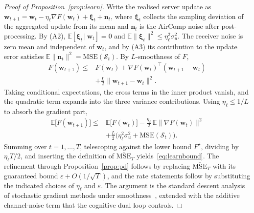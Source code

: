\documentclass[lettersize,journal]{IEEEtran}
\newcommand{\bw}{\bm{w}}
\newcommand{\calS}{\mathcal{S}}
\begin{document}
\begin{proof}[Proof of Proposition~\ref{prop:learn}]
Write the realised server update as $\bw_{t+1}=\bw_t-\eta_\ell\nabla F(\bw_t)+\bm{\xi}_t+\bm{n}_t$, where $\bm{\xi}_t$ collects the sampling deviation of the aggregated update from its mean and $\bm{n}_t$ is the AirComp noise after post-processing. By (A2), $\mathbb{E}[\bm{\xi}_t\,|\,\bw_t]=0$ and $\mathbb{E}\lVert\bm{\xi}_t\rVert^2\le\eta_\ell^2\sigma_u^2$. The receiver noise is zero mean and independent of $\bw_t$, and by (A3) its contribution to the update error satisfies $\mathbb{E}\lVert\bm{n}_t\rVert^2=\mathrm{MSE}(\calS_t)$. By $L$-smoothness of $F$,
\begin{align*}
F(\bw_{t+1})\le{}& F(\bw_t)+\nabla F(\bw_t)^{\!\top}(\bw_{t+1}-\bw_t)\\
&+\tfrac{L}{2}\lVert\bw_{t+1}-\bw_t\rVert^2 .
\end{align*}
Taking conditional expectations, the cross terms in the inner product vanish, and the quadratic term expands into the three variance contributions. Using $\eta_\ell\le 1/L$ to absorb the gradient part,
\begin{align*}
\mathbb{E}\big[F(\bw_{t+1})\big]\le{}&\mathbb{E}\big[F(\bw_t)\big]-\tfrac{\eta_\ell}{2}\,\mathbb{E}\lVert\nabla F(\bw_t)\rVert^2\\
&+\tfrac{L}{2}\big(\eta_\ell^2\sigma_u^2+\mathrm{MSE}(\calS_t)\big).
\end{align*}
Summing over $t=1,\dots,T$, telescoping against the lower bound $F^\star$, dividing by $\eta_\ell T/2$, and inserting the definition of $\overline{\mathrm{MSE}}_T$ yields~\eqref{eq:learnbound}. The refinement through Proposition~\ref{prop:pd} follows by replacing $\overline{\mathrm{MSE}}_T$ with its guaranteed bound $\varepsilon+O(1/\sqrt{T})$, and the rate statements follow by substituting the indicated choices of $\eta_\ell$ and $\varepsilon$. The argument is the standard descent analysis of stochastic gradient methods under smoothness~\cite{bottou2018}, extended with the additive channel-noise term that the cognitive dual loop controls.
\end{proof}
\end{document}
